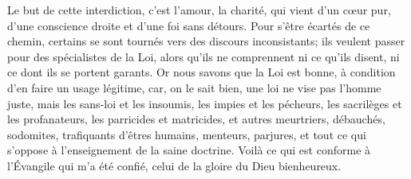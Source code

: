 Le but de cette interdiction, c’est l’amour, la charité,
	qui vient d’un cœur pur, d’une conscience droite et d’une foi sans détours.
Pour s’être écartés de ce chemin,
	certains se sont tournés vers des discours inconsistants;
	ils veulent passer pour des spécialistes de la Loi,
	alors qu’ils ne comprennent ni ce qu’ils disent, ni ce dont ils se portent garants.
Or nous savons que la Loi est bonne, à condition d’en faire un usage légitime,
	car, on le sait bien, une loi ne vise pas l’homme juste,
	mais les sans-loi et les insoumis, les impies et les pécheurs,
	les sacrilèges et les profanateurs, les parricides et matricides,
	et autres meurtriers, débauchés, sodomites, trafiquants d’êtres humains,
	menteurs, parjures, et tout ce qui s’oppose à l’enseignement de la saine doctrine.
Voilà ce qui est conforme à l’Évangile qui m’a été confié,
	celui de la gloire du Dieu bienheureux.
